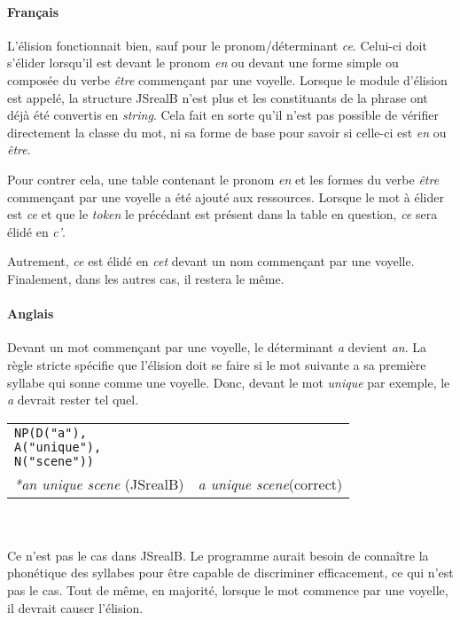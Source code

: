 \documentclass[11pt]{article} %
\newcommand{\system}[1]{\textsf{#1}}
\newcommand{\JSB}{\system{JSrealB}}
\newcommand{\real}[1]{\emph{#1}}
\begin{document}
\paragraph{Français}
L'élision fonctionnait bien, sauf pour le pronom/déterminant \emph{ce}. Celui-ci doit
s'élider lorsqu'il est devant le pronom \emph{en} ou devant une forme simple ou composée
du verbe \emph{être} commençant par une voyelle. Lorsque le module d'élision est appelé, la structure \JSB{} n'est plus 
et les constituants de la phrase ont déjà été convertis en \emph{string}. Cela fait en sorte
qu'il n'est pas possible de vérifier directement la classe du mot, ni sa forme de base pour savoir
si celle-ci est \emph{en} ou \emph{être}. 

Pour contrer cela, une table contenant le pronom \emph{en}
et les formes du verbe \emph{être} commençant par une voyelle a été ajouté aux ressources.
Lorsque le mot à élider est \emph{ce} et que le \emph{token} le précédant est présent
dans la table en question, \emph{ce} sera élidé en \emph{c'}. 

Autrement, \emph{ce} est
élidé en \emph{cet} devant un nom commençant par une voyelle. Finalement, dans les autres cas, 
il restera le même.

\paragraph{Anglais}
Devant un mot commençant par une voyelle, le déterminant \emph{a} devient \emph{an}.
La règle stricte spécifie que l'élision doit se faire si le mot suivante a sa première
syllabe qui sonne comme une voyelle. Donc, devant le mot \emph{unique} par exemple,
le \emph{a} devrait rester tel quel. \\
\begin{example}
\caption{}
\begin{tabular}{p{5cm} p{8cm}}
\begin{alltt}
NP(D("a"),
   A("unique"),
   N("scene"))
\end{alltt} &
\begin{alltt}
\end{alltt} \\
\real{*an unique scene} (\JSB{}) & \real{a unique scene}(correct)
\end{tabular}
\end{example}
\\
\\
Ce n'est pas le cas dans \JSB{}. Le programme aurait 
besoin de connaître la phonétique des syllabes pour être capable de discriminer
efficacement, ce qui n'est pas le cas. Tout de même, en majorité, lorsque le mot commence
par une voyelle, il devrait causer l'élision.
\end{document}
